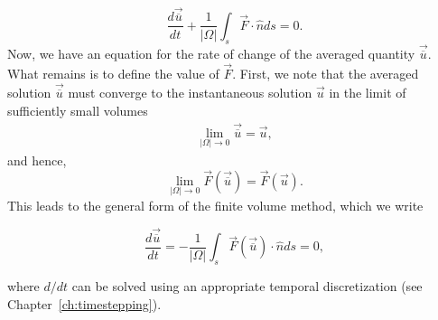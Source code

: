 \begin{equation}
 \frac{d \vec{\overline u}}{dt} + \frac{1}{|\Omega|} \int_s \vec{F} \cdot\hat nds=0.
\end{equation}
Now, we have an equation for the rate of change of the averaged quantity $\vec{\overline u}$. What remains is to define the value of $\vec{F}$. First, we note that the averaged solution $\vec{\overline u}$ must converge to the instantaneous solution $\vec{u}$ in the limit of sufficiently small volumes
\begin{align}
 \lim_{|\Omega| \rightarrow 0} \vec{\overline u} = \vec u,
\end{align}
and hence,
\begin{equation}
 \lim_{|\Omega| \rightarrow 0} \vec F (\vec {\overline{u}}) = \vec F(\vec u).
\end{equation}
This leads to the general form of the finite volume method, which we write 
\begin{eqBox}
\begin{equation}
 \frac{d \vec{\overline u}}{dt} = - \frac{1}{|\Omega|} \int_s \vec{F} (\vec{\overline u})\cdot\hat nds=0,
 \label{eq:fvm}
\end{equation}
\end{eqBox}
where $d/dt$ can be solved using an appropriate temporal discretization (see Chapter~\ref{ch:timestepping}). 

